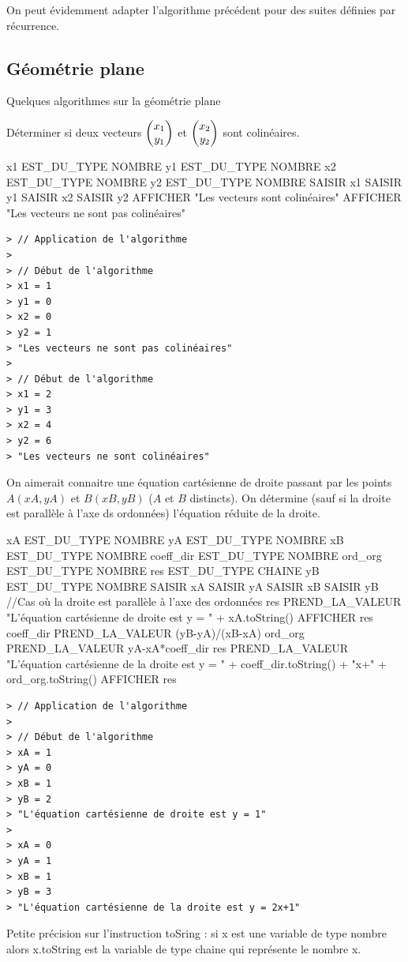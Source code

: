 On peut évidemment adapter l'algorithme précédent pour des suites définies par récurrence.
\subsection{Géométrie plane}
Quelques algorithmes sur la géométrie plane\newline

Déterminer si deux vecteurs $\begin{pmatrix}x_1 \\y_1 \end{pmatrix}$ et $\begin{pmatrix}x_2 \\y_2 \end{pmatrix}$ sont colinéaires.
\begin{algobox}
\Variables
\Ligne x1 EST\_DU\_TYPE NOMBRE
\Ligne y1 EST\_DU\_TYPE NOMBRE
\Ligne x2 EST\_DU\_TYPE NOMBRE
\Ligne y2 EST\_DU\_TYPE NOMBRE
\DebutAlgo
\Ligne SAISIR x1
\Ligne SAISIR y1
\Ligne SAISIR x2
\Ligne SAISIR y2
\DebutSi
\Ligne AFFICHER "Les vecteurs sont colinéaires"
\FinSi
\Sinon
\DebutSinon
\Ligne AFFICHER "Les vecteurs ne sont pas colinéaires"
\FinSinon
\FinAlgo
\end{algobox}
\begin{verbatim}
> // Application de l'algorithme
>
> // Début de l'algorithme
> x1 = 1
> y1 = 0
> x2 = 0
> y2 = 1 
> "Les vecteurs ne sont pas colinéaires"
>
> // Début de l'algorithme
> x1 = 2
> y1 = 3
> x2 = 4
> y2 = 6 
> "Les vecteurs ne sont colinéaires"
\end{verbatim}

On aimerait connaitre une équation cartésienne de droite passant par les points $A(xA,yA)$ et $B(xB,yB)$ ($A$ et $B$ distincts). On détermine (sauf si la droite est parallèle à l'axe ds ordonnées) l'équation réduite de la droite.
\begin{algobox}
\Variables
\Ligne xA EST\_DU\_TYPE NOMBRE
\Ligne yA EST\_DU\_TYPE NOMBRE
\Ligne xB EST\_DU\_TYPE NOMBRE
\Ligne coeff\_dir EST\_DU\_TYPE NOMBRE
\Ligne ord\_org EST\_DU\_TYPE NOMBRE
\Ligne res EST\_DU\_TYPE CHAINE
\Ligne yB EST\_DU\_TYPE NOMBRE
\DebutAlgo
\Ligne SAISIR xA
\Ligne SAISIR yA
\Ligne SAISIR xB
\Ligne SAISIR yB
\DebutSi
\Ligne //Cas où la droite est parallèle à l'axe des ordonnées
\Ligne res PREND\_LA\_VALEUR "L'équation cartésienne de droite est y = " + xA.toString()
\Ligne AFFICHER res
\FinSi
\Sinon
\DebutSinon
\Ligne coeff\_dir PREND\_LA\_VALEUR (yB-yA)/(xB-xA)
\Ligne ord\_org PREND\_LA\_VALEUR yA-xA*coeff\_dir
\Ligne res PREND\_LA\_VALEUR "L'équation cartésienne de la droite est y = " + coeff\_dir.toString() + "x+" + ord\_org.toString()
\Ligne AFFICHER res
\FinSinon
\FinAlgo
\end{algobox}
\begin{verbatim}
> // Application de l'algorithme
>
> // Début de l'algorithme
> xA = 1
> yA = 0
> xB = 1
> yB = 2
> "L'équation cartésienne de droite est y = 1"
>
> xA = 0
> yA = 1
> xB = 1
> yB = 3
> "L'équation cartésienne de la droite est y = 2x+1"
\end{verbatim}
Petite précision sur l'instruction toSring : si x est une variable de type nombre alors x.toString est la variable de type chaine qui représente le nombre x.
